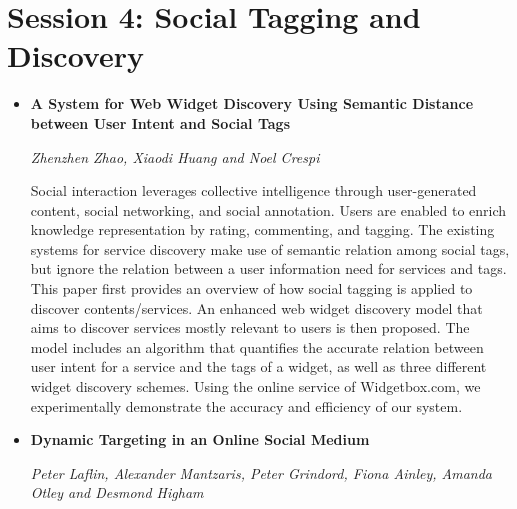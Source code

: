 \documentclass[a4paper,12pt,svgnames]{report}
\begin{document}
\section{Session 4: Social Tagging and Discovery}
\begin{itemize}

\item \textbf{A System for Web Widget Discovery Using Semantic Distance between
User Intent and Social Tags}

\textit{Zhenzhen Zhao, Xiaodi Huang and Noel Crespi}

Social interaction leverages collective intelligence through user-generated
content, social networking, and social annotation. Users are enabled to enrich
knowledge representation by rating, commenting, and tagging. The existing
systems for service discovery make use of semantic relation among social tags,
but ignore the relation between a user information need for services and tags.
This paper first provides an overview of how social tagging is applied to
discover contents/services. An enhanced web widget discovery model that aims to
discover services mostly relevant to users is then proposed. The model includes
an algorithm that quantifies the accurate relation between user intent for a
service and the tags of a widget, as well as three different widget discovery
schemes. Using the online service of Widgetbox.com, we experimentally
demonstrate the accuracy and efficiency of our system.


\item \textbf{Dynamic Targeting in an Online Social Medium}

\textit{Peter Laflin, Alexander Mantzaris, Peter Grindord, Fiona Ainley, Amanda
Otley and Desmond Higham}


\end{itemize}
\end{document}
